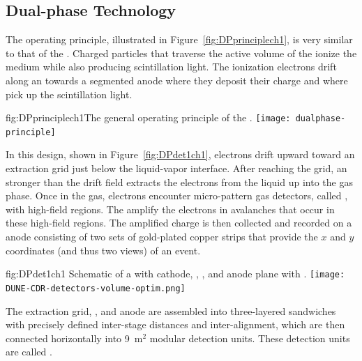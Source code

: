 \FloatBarrier
\subsection{Dual-phase Technology}
\label{sec:fddp-exec-splar}

The  operating principle, illustrated in Figure~\ref{fig:DPprinciplech1}, is very similar to that of the . %
 Charged particles that traverse the active volume of the  ionize the medium while also producing scintillation light.  The ionization electrons drift along an \efield towards a segmented anode where they deposit their charge and where   pick up the scintillation light. 
 
 
\begin{dunefigure}{fig:DPprinciplech1}{The general operating principle of the  .}
\texttt{[image: dualphase-principle]}
\end{dunefigure}

In this design, shown in Figure~\ref{fig:DPdet1ch1}, electrons drift upward toward an extraction grid just below the liquid-vapor interface. 
After reaching the grid, an \efield stronger than the \dpnominaldriftfield{} drift field extracts the electrons from the liquid up into the gas phase. Once in the gas, electrons encounter micro-pattern gas detectors, called , with high-field regions. The  amplify the electrons in avalanches that occur in these high-field regions. The amplified charge is then collected and recorded on a \twod anode
consisting of two sets of %
gold-plated copper strips that provide the $x$ and $y$ coordinates (and thus two views) of an event. 

\begin{dunefigure}{fig:DPdet1ch1}
  {Schematic of a \nominalmodsize {}    with cathode, , , and anode plane with .}
  \texttt{[image: DUNE-CDR-detectors-volume-optim.png]}
\end{dunefigure}

 The extraction grid, , and anode are assembled into three-layered sandwiches with precisely defined inter-stage distances and inter-alignment,  which are then connected horizontally into \num{9}~m$^2$ modular detection units. These detection units are called .

